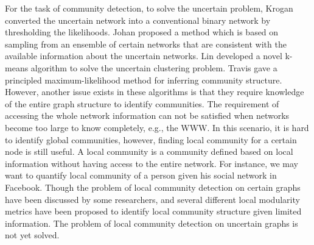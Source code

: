 \documentclass[\main/thesis.tex]{subfiles}
\begin{document}
For the task of community detection, to solve the uncertain problem, Krogan \cite{krogan2006global} converted the uncertain network into a conventional binary network by thresholding the likelihoods. Johan \cite{dahlin2011method} proposed a method which is based on sampling from an ensemble of certain networks that are consistent with the available information about the uncertain networks. Lin \cite{liureliable} developed a novel k-means algorithm to solve the uncertain clustering problem. Travis \cite{martin2016structural} gave a principled maximum-likelihood method for inferring community structure. However, another issue exists in these algorithms is that they require knowledge of the entire graph structure to identify communities. The requirement of accessing the whole network information can not be satisfied when networks become too large to know completely, e.g., the WWW. In this scenario, it is hard to identify global communities, however, finding local community for a certain node is still useful. A local community is a community defined based on local information without having access to the entire network. For instance, we may want to quantify local community of a person given his social network in Facebook. Though the problem of local community detection on certain graphs have been discussed by some researchers, and several different local modularity metrics \cite{clauset2005finding,chen2009detecting,chen2009local} have been proposed to identify local community structure given limited information. The problem of local community detection on uncertain graphs is not yet solved.
\end{document}
